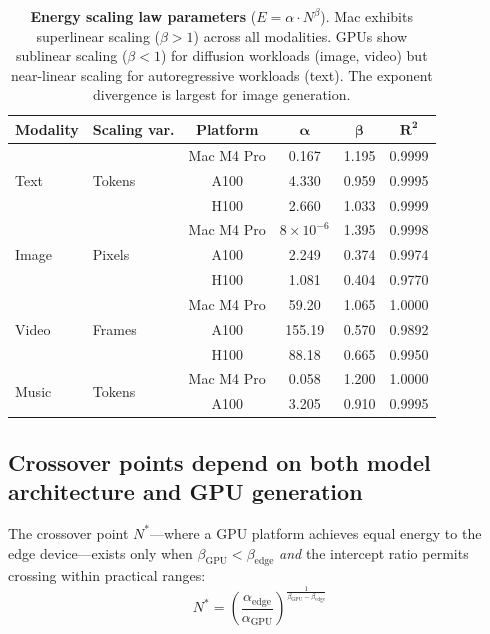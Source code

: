 \documentclass[11pt]{article}
\begin{document}
\begin{table}[t]
\centering
\caption{\textbf{Energy scaling law parameters} ($E = \alpha \cdot N^\beta$). Mac exhibits superlinear scaling ($\beta > 1$) across all modalities. GPUs show sublinear scaling ($\beta < 1$) for diffusion workloads (image, video) but near-linear scaling for autoregressive workloads (text). The exponent divergence is largest for image generation.}
\label{tab:scaling}
\small
\begin{tabular}{@{}llcccc@{}}
\toprule
\textbf{Modality} & \textbf{Scaling var.} & \textbf{Platform} & $\boldsymbol{\alpha}$ & $\boldsymbol{\beta}$ & $\boldsymbol{R^2}$ \\
\midrule
\multirow{3}{*}{Text} & \multirow{3}{*}{Tokens} & Mac M4 Pro & 0.167 & 1.195 & 0.9999 \\
 & & A100 & 4.330 & 0.959 & 0.9995 \\
 & & H100 & 2.660 & 1.033 & 0.9999 \\
\midrule
\multirow{3}{*}{Image} & \multirow{3}{*}{Pixels} & Mac M4 Pro & $8 \times 10^{-6}$ & 1.395 & 0.9998 \\
 & & A100 & 2.249 & 0.374 & 0.9974 \\
 & & H100 & 1.081 & 0.404 & 0.9770 \\
\midrule
\multirow{3}{*}{Video} & \multirow{3}{*}{Frames} & Mac M4 Pro & 59.20 & 1.065 & 1.0000 \\
 & & A100 & 155.19 & 0.570 & 0.9892 \\
 & & H100 & 88.18 & 0.665 & 0.9950 \\
\midrule
\multirow{2}{*}{Music} & \multirow{2}{*}{Tokens} & Mac M4 Pro & 0.058 & 1.200 & 1.0000 \\
 & & A100 & 3.205 & 0.910 & 0.9995 \\
\bottomrule
\end{tabular}
\end{table}

\subsection{Crossover points depend on both model architecture and GPU generation}

The crossover point $N^*$---where a GPU platform achieves equal energy to the edge device---exists only when $\beta_\text{GPU} < \beta_\text{edge}$ \textit{and} the intercept ratio permits crossing within practical ranges:
\begin{equation}
N^* = \left(\frac{\alpha_\text{edge}}{\alpha_\text{GPU}}\right)^{\frac{1}{\beta_\text{GPU} - \beta_\text{edge}}}
\end{equation}
\end{document}
